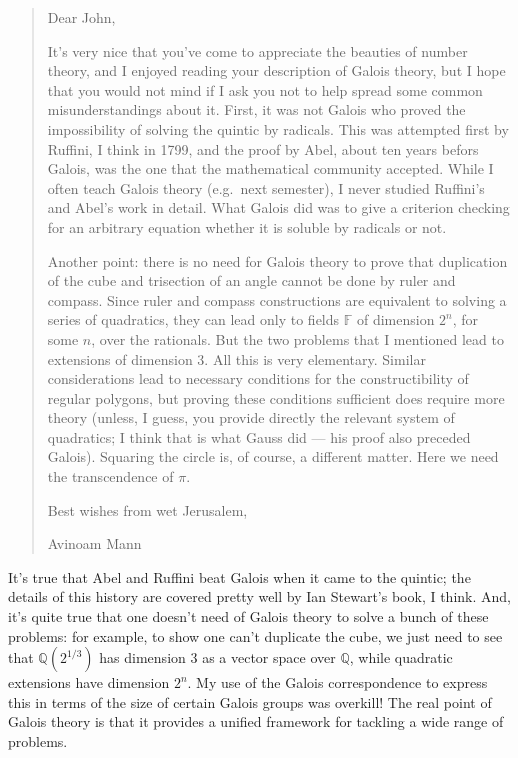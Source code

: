 \documentclass{article}
\begin{document}
\begin{quote}
Dear John,

It's very nice that you've come to appreciate the beauties of number
theory, and I enjoyed reading your description of Galois theory, but I
hope that you would not mind if I ask you not to help spread some common
misunderstandings about it. First, it was not Galois who proved the
impossibility of solving the quintic by radicals. This was attempted
first by Ruffini, I think in 1799, and the proof by Abel, about ten
years befors Galois, was the one that the mathematical community
accepted. While I often teach Galois theory (e.g.~next semester), I
never studied Ruffini's and Abel's work in detail. What Galois did was
to give a criterion checking for an arbitrary equation whether it is
soluble by radicals or not.

Another point: there is no need for Galois theory to prove that
duplication of the cube and trisection of an angle cannot be done by
ruler and compass. Since ruler and compass constructions are equivalent
to solving a series of quadratics, they can lead only to fields
\(\mathbb{F}\) of dimension \(2^n\), for some \(n\), over the rationals.
But the two problems that I mentioned lead to extensions of dimension 3.
All this is very elementary. Similar considerations lead to necessary
conditions for the constructibility of regular polygons, but proving
these conditions sufficient does require more theory (unless, I guess,
you provide directly the relevant system of quadratics; I think that is
what Gauss did --- his proof also preceded Galois). Squaring the circle
is, of course, a different matter. Here we need the transcendence of
\(\pi\).

Best wishes from wet Jerusalem,

Avinoam Mann
\end{quote}

It's true that Abel and Ruffini beat Galois when it came to the quintic;
the details of this history are covered pretty well by Ian Stewart's
book, I think. And, it's quite true that one doesn't need of Galois
theory to solve a bunch of these problems: for example, to show one
can't duplicate the cube, we just need to see that
\(\mathbb{Q}(2^{1/3})\) has dimension 3 as a vector space over
\(\mathbb{Q}\), while quadratic extensions have dimension \(2^n\). My
use of the Galois correspondence to express this in terms of the size of
certain Galois groups was overkill! The real point of Galois theory is
that it provides a unified framework for tackling a wide range of
problems.
\end{document}
